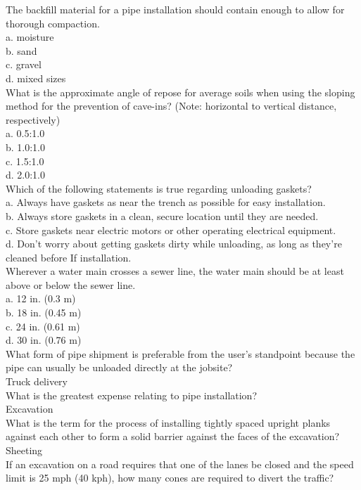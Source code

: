 The backfill material for a pipe installation should contain enough	to allow for thorough compaction.\\
a.	moisture\\
b.	sand\\
c.	gravel\\
d.	mixed sizes\\
What is the approximate angle of repose for average soils when using the sloping method for the prevention of cave-ins? (Note: horizontal to vertical distance, respectively)\\
a.	0.5:1.0\\
b.	1.0:1.0\\
c.	1.5:1.0\\
d.	2.0:1.0\\
Which of the following statements is true regarding unloading gaskets?\\
a.	Always have gaskets as near the trench as possible for easy installation.\\
b.	Always store gaskets in a clean, secure location until they are needed.\\
c.	Store gaskets near electric motors or other operating electrical equipment.\\
d.	Don't worry about getting gaskets dirty while unloading, as long as they're cleaned before If installation.\\
Wherever a water main crosses a sewer line, the water main should be at least	above or below the sewer line.\\
a.	12 in. (0.3 m)\\
b.	18 in. (0.45 m)\\
c.	24 in. (0.61 m)\\
d.	30 in. (0.76 m)\\
What form of pipe shipment is preferable from the user's standpoint because the pipe can usually be unloaded directly at the jobsite?\\
Truck delivery\\
What is the greatest expense relating to pipe installation?\\
Excavation\\
What is the term for the process of installing tightly spaced upright planks against each other to form a solid barrier against the faces of the excavation?\\
Sheeting\\
If an excavation on a road requires that one of the lanes be closed and the speed limit is 25 mph (40 kph), how many cones are required to divert the traffic?\\
